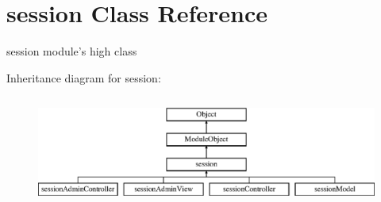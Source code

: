 \hypertarget{classsession}{\section{session Class Reference}
\label{classsession}
}


session module's high class  


Inheritance diagram for session\+:\begin{figure}[H]
\begin{center}
\leavevmode
\includegraphics[height=3.660131cm]{classsession}
\end{center}
\end{figure}
